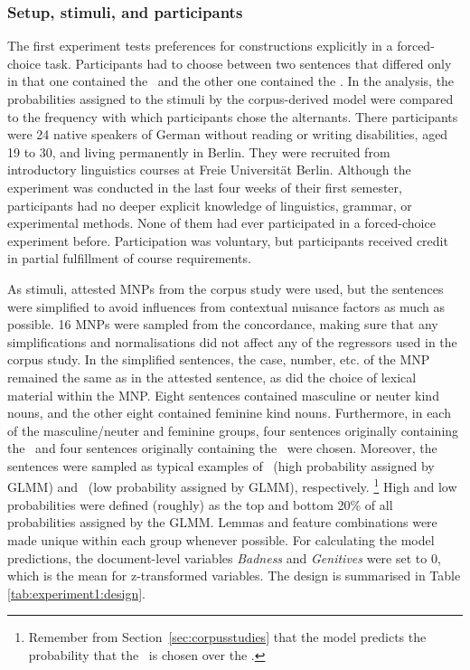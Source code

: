 \subsubsection{Setup, stimuli, and participants}

The first experiment tests preferences for constructions explicitly in a forced-choice task.
Participants had to choose between two sentences that differed only in that one contained the \NACa\, and the other one contained the \PGCa.
In the analysis, the probabilities assigned to the stimuli by the corpus-derived model were compared to the frequency with which participants chose the alternants.
There participants were 24 native speakers of German without reading or writing disabilities, aged 19 to 30, and living permanently in Berlin.
They were recruited from introductory linguistics courses at Freie Universität Berlin.
Although the experiment was conducted in the last four weeks of their first semester, participants had no deeper explicit knowledge of linguistics, grammar, or experimental methods.
None of them had ever participated in a forced-choice experiment before.
Participation was voluntary, but participants received credit in partial fulfillment of course requirements.

As stimuli, attested MNPs from the corpus study were used, but the sentences were simplified to avoid influences from contextual nuisance factors as much as possible.
16 MNPs were sampled from the concordance, making sure that any simplifications and normalisations did not affect any of the regressors used in the corpus study.
In the simplified sentences, the case, number, etc. of the MNP remained the same as in the attested sentence, as did the choice of lexical material within the MNP.
Eight sentences contained masculine or neuter kind nouns, and the other eight contained feminine kind nouns.
Furthermore, in each of the masculine\slash neuter and feminine groups, four sentences originally containing the \NACa\ and four sentences originally containing the \PGCa\ were chosen.
Moreover, the sentences were sampled as typical examples of \PGCa\ (high probability assigned by GLMM) and \NACa\ (low probability assigned by GLMM), respectively.%
\footnote{Remember from Section~\ref{sec:corpusstudies} that the model predicts the probability that the \PGCa\ is chosen over the \NACa.}
High and low probabilities were defined (roughly) as the top and bottom 20\% of all probabilities assigned by the GLMM.
Lemmas and feature combinations were made unique within each group whenever possible.
For calculating the model predictions, the document-level variables \textit{Badness} and \textit{Genitives} were set to 0, which is the mean for z-transformed variables.
The design is summarised in Table \ref{tab:experiment1:design}.


